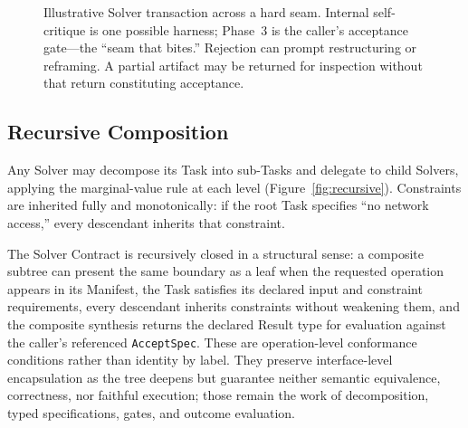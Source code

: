 \documentclass[11pt]{article}
\let\oldtexttt\texttt
\renewcommand{\texttt}[1]{\oldtexttt{\small #1}}
\begin{document}
\begin{figure}[p]
\caption{Illustrative Solver transaction across a hard seam. Internal self-critique is one possible harness; Phase~3 is the caller's acceptance gate---the ``seam that bites.'' Rejection can prompt restructuring or reframing. A partial artifact may be returned for inspection without that return constituting acceptance.}
\label{fig:sequence}
\end{figure}

\subsection{Recursive Composition}
\label{sec:recursive-composition}

Any Solver may decompose its Task into sub-Tasks and delegate to child Solvers, applying the marginal-value rule at each level (Figure~\ref{fig:recursive}). Constraints are inherited fully and monotonically: if the root Task specifies ``no network access,'' every descendant inherits that constraint.

The Solver Contract is recursively closed in a structural sense: a composite subtree can present the same boundary as a leaf when the requested operation appears in its Manifest, the Task satisfies its declared input and constraint requirements, every descendant inherits constraints without weakening them, and the composite synthesis returns the declared Result type for evaluation against the caller's referenced \texttt{AcceptSpec}. These are operation-level conformance conditions rather than identity by label. They preserve interface-level encapsulation as the tree deepens but guarantee neither semantic equivalence, correctness, nor faithful execution; those remain the work of decomposition, typed specifications, gates, and outcome evaluation.
\end{document}
